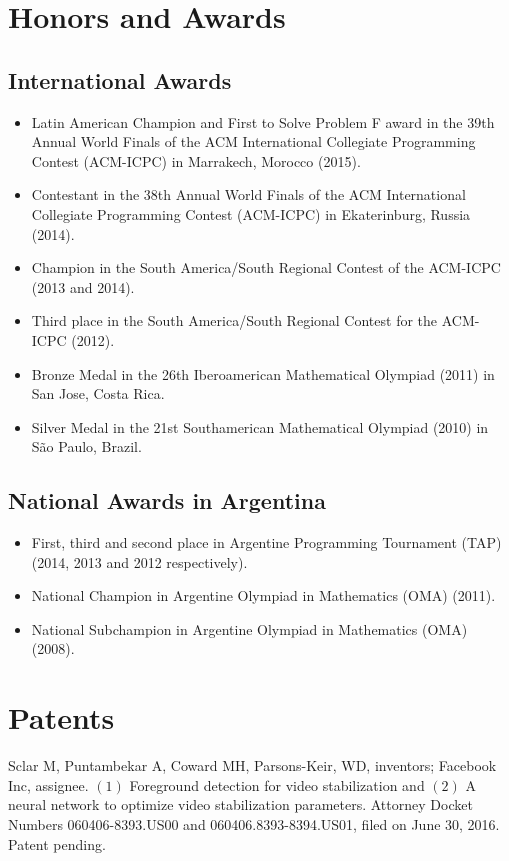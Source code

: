 \documentclass [a4paper, 11pt]{article}
\begin{document}
\section* {Honors and Awards}

\subsection* {International Awards}

\begin{itemize} \itemsep.05cm
	\item[] Latin American Champion and First to Solve Problem F award in the 39th Annual World Finals of the ACM International Collegiate Programming Contest (ACM-ICPC) in Marrakech, Morocco (2015).
	\item[] Contestant in the 38th Annual World Finals of the ACM International Collegiate Programming Contest (ACM-ICPC) in Ekaterinburg, Russia (2014).
	\item[] Champion in the South America/South Regional Contest of the ACM-ICPC (2013 and 2014).
	\item[] Third place in the South America/South Regional Contest for the ACM-ICPC (2012).
	\item[] Bronze Medal in the 26th Iberoamerican Mathematical Olympiad (2011) in San Jose, Costa Rica.
	\item[] Silver Medal in the 21st Southamerican Mathematical Olympiad (2010) in S\~ao Paulo, Brazil. 
\end{itemize}

\subsection* {National Awards in Argentina}

\begin{itemize} \itemsep.05cm
    \item[] First, third and second place in Argentine Programming Tournament (TAP) (2014, 2013 and 2012 respectively).
	\item[] National Champion in Argentine Olympiad in Mathematics (OMA) (2011).
	\item[] National Subchampion in Argentine Olympiad in Mathematics (OMA) (2008).
	
\end{itemize}

\newpage
\section* {Patents}
Sclar M, Puntambekar A, Coward MH, Parsons-Keir, WD, inventors; Facebook Inc,
assignee. $(1)$ Foreground detection for video stabilization and $(2)$ A neural network to optimize video stabilization parameters. Attorney Docket Numbers 060406-8393.US00 and 060406.8393-8394.US01, filed on June 30, 2016. Patent pending.
\end{document}

